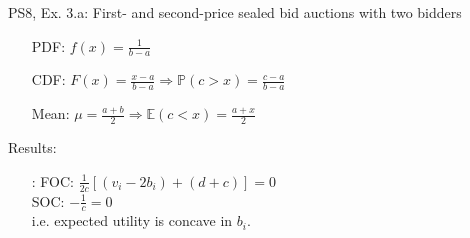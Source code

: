 \begin{frame}{PS8, Ex. 3.a: First- and second-price sealed bid auctions with two bidders}
\begin{multicols}{2}
      \begin{enumerate}
        \item[PDF:] $f(x)=\frac{1}{b-a}$
        \item[CDF:] $F(x)=\frac{x-a}{b-a}\Rightarrow\mathbb{P}(c>x)=\frac{c-a}{b-a}$
        \item[Mean:] $\mu=\frac{a+b}{2}\Rightarrow\mathbb{E}(c<x)=\frac{a+x}{2}$
      \end{enumerate}
      \vspace{-6pt}
      Results:
      \vspace{-6pt}
      \begin{itemize}
        \item[\nth{2}:] FOC: $\frac{1}{2c}[(v_i-2b_i)+(d+c)]=0$\\
                        SOC: $-\frac{1}{c}=0$\\
                        i.e. expected utility is concave in $b_i$.
      \end{itemize}
      \vfill\null
    \end{multicols}
\end{frame}
